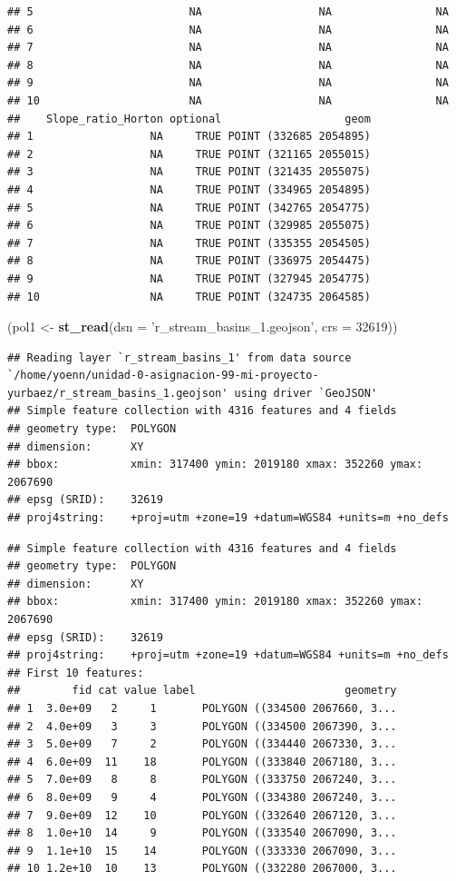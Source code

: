 \documentclass[11pt,]{article}
\newenvironment{Shaded}{\begin{snugshade}}{\end{snugshade}}
\newcommand{\KeywordTok}[1]{\textcolor[rgb]{0.13,0.29,0.53}{\textbf{#1}}}
\newcommand{\DataTypeTok}[1]{\textcolor[rgb]{0.13,0.29,0.53}{#1}}
\newcommand{\DecValTok}[1]{\textcolor[rgb]{0.00,0.00,0.81}{#1}}
\newcommand{\StringTok}[1]{\textcolor[rgb]{0.31,0.60,0.02}{#1}}
\newcommand{\NormalTok}[1]{#1}
\begin{document}
\begin{verbatim}
## 5                        NA                  NA                NA
## 6                        NA                  NA                NA
## 7                        NA                  NA                NA
## 8                        NA                  NA                NA
## 9                        NA                  NA                NA
## 10                       NA                  NA                NA
##    Slope_ratio_Horton optional                   geom
## 1                  NA     TRUE POINT (332685 2054895)
## 2                  NA     TRUE POINT (321165 2055015)
## 3                  NA     TRUE POINT (321435 2055075)
## 4                  NA     TRUE POINT (334965 2054895)
## 5                  NA     TRUE POINT (342765 2054775)
## 6                  NA     TRUE POINT (329985 2055075)
## 7                  NA     TRUE POINT (335355 2054505)
## 8                  NA     TRUE POINT (336975 2054475)
## 9                  NA     TRUE POINT (327945 2054775)
## 10                 NA     TRUE POINT (324735 2064585)
\end{verbatim}

\begin{Shaded}
\begin{Highlighting}[]
\NormalTok{(pol1 <-}\StringTok{ }\KeywordTok{st_read}\NormalTok{(}\DataTypeTok{dsn =} \StringTok{'r_stream_basins_1.geojson'}\NormalTok{, }\DataTypeTok{crs =} \DecValTok{32619}\NormalTok{))}
\end{Highlighting}
\end{Shaded}

\begin{verbatim}
## Reading layer `r_stream_basins_1' from data source `/home/yoenn/unidad-0-asignacion-99-mi-proyecto-yurbaez/r_stream_basins_1.geojson' using driver `GeoJSON'
## Simple feature collection with 4316 features and 4 fields
## geometry type:  POLYGON
## dimension:      XY
## bbox:           xmin: 317400 ymin: 2019180 xmax: 352260 ymax: 2067690
## epsg (SRID):    32619
## proj4string:    +proj=utm +zone=19 +datum=WGS84 +units=m +no_defs
\end{verbatim}

\begin{verbatim}
## Simple feature collection with 4316 features and 4 fields
## geometry type:  POLYGON
## dimension:      XY
## bbox:           xmin: 317400 ymin: 2019180 xmax: 352260 ymax: 2067690
## epsg (SRID):    32619
## proj4string:    +proj=utm +zone=19 +datum=WGS84 +units=m +no_defs
## First 10 features:
##        fid cat value label                       geometry
## 1  3.0e+09   2     1       POLYGON ((334500 2067660, 3...
## 2  4.0e+09   3     3       POLYGON ((334500 2067390, 3...
## 3  5.0e+09   7     2       POLYGON ((334440 2067330, 3...
## 4  6.0e+09  11    18       POLYGON ((333840 2067180, 3...
## 5  7.0e+09   8     8       POLYGON ((333750 2067240, 3...
## 6  8.0e+09   9     4       POLYGON ((334380 2067240, 3...
## 7  9.0e+09  12    10       POLYGON ((332640 2067120, 3...
## 8  1.0e+10  14     9       POLYGON ((333540 2067090, 3...
## 9  1.1e+10  15    14       POLYGON ((333330 2067090, 3...
## 10 1.2e+10  10    13       POLYGON ((332280 2067000, 3...
\end{verbatim}
\end{document}

